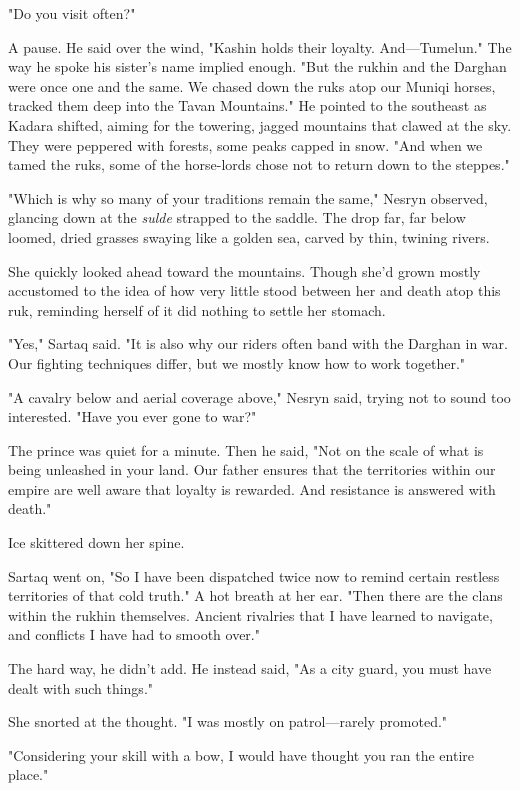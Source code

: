 "Do you visit often?"

A pause.
He said over the wind, "Kashin holds their loyalty.
And---Tumelun."
The way he spoke his sister's name implied enough.
"But the rukhin and the Darghan were once one and the same.
We chased down the ruks atop our Muniqi horses, tracked them deep into the Tavan Mountains."
He pointed to the southeast as Kadara shifted, aiming for the towering, jagged mountains that clawed at the sky.
They were peppered with forests, some peaks capped in snow.
"And when we tamed the ruks, some of the horse-lords chose not to return down to the steppes."

"Which is why so many of your traditions remain the same," Nesryn observed, glancing down at the \emph{sulde} strapped to the saddle.
The drop far, far below loomed, dried grasses swaying like a golden sea, carved by thin, twining rivers.

She quickly looked ahead toward the mountains.
Though she'd grown mostly accustomed to the idea of how very little stood between her and death atop this ruk, reminding herself of it did nothing to settle her stomach.

"Yes," Sartaq said.
"It is also why our riders often band with the Darghan in war.
Our fighting techniques differ, but we mostly know how to work together."

"A cavalry below and aerial coverage above," Nesryn said, trying not to sound too interested.
"Have you ever gone to war?"

The prince was quiet for a minute.
Then he said, "Not on the scale of what is being unleashed in your land.
Our father ensures that the territories within our empire are well aware that loyalty is rewarded.
And resistance is answered with death."

Ice skittered down her spine.

Sartaq went on, "So I have been dispatched twice now to remind certain restless territories of that cold truth."
A hot breath at her ear.
"Then there are the clans within the rukhin themselves.
Ancient rivalries that I have learned to navigate, and conflicts I have had to smooth over."

The hard way, he didn't add.
He instead said, "As a city guard, you must have dealt with such things."

She snorted at the thought.
"I was mostly on patrol---rarely promoted."

"Considering your skill with a bow, I would have thought you ran the entire place."

